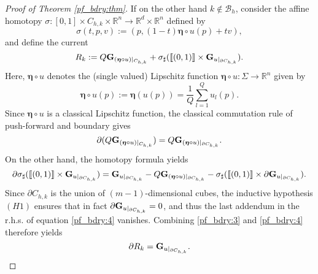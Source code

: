 \documentclass[a4paper,11pt,reqno]{amsart}
\theoremstyle{definition}
\numberwithin{equation}{section}
\numberwithin{subsection}{section}
\newcommand{\R}{\mathbb{R}}
\newcommand{\bfeta}{\boldsymbol{\eta}}
\begin{document}
\begin{proof}[Proof of Theorem \ref{pf_bdry:thm}]
If on the other hand $k \notin \mathscr{B}_{h}$, consider the affine homotopy $\sigma \colon \left[ 0,1 \right] \times C_{h,k} \times \R^{n} \to \R^{d} \times \R^{n}$ defined by
\begin{equation}
\sigma(t,p,v) := \left( p, (1-t)\bfeta \circ u(p) + t v \right), 
\end{equation}
and define the current
\begin{equation}
R_{k} := Q {\bf G}_{(\bfeta \circ u)|_{C_{h,k}}} + \sigma_{\sharp}(\llbracket (0,1) \rrbracket \times {\bf G}_{u|_{\partial C_{h,k}}}).
\end{equation}
Here, $\bfeta \circ u$ denotes the (single valued) Lipschitz function $\bfeta \circ u \colon \Sigma \to \R^{n}$ given by
\[
\bfeta \circ u(p) := \bfeta(u(p)) = \frac{1}{Q} \sum_{l=1}^{Q} u_{l}(p).
\]
Since $\bfeta \circ u$ is a classical Lipschitz function, the classical commutation rule of push-forward and boundary gives 
\begin{equation} \label{pf_bdry:3}
\partial (Q {\bf G}_{(\bfeta \circ u)|_{C_{h,k}}}) = Q {\bf G}_{(\bfeta \circ u)|_{\partial C_{h,k}}}.
\end{equation}
On the other hand, the homotopy formula \cite[(26.22)]{Sim83} yields
\begin{equation} \label{pf_bdry:4}
\partial \sigma_{\sharp}(\llbracket (0,1) \rrbracket \times {\bf G}_{u|_{\partial C_{h,k}}}) = {\bf G}_{u|_{\partial C_{h,k}}} - Q {\bf G}_{(\bfeta \circ u)|_{\partial C_{h,k}}} - \sigma_{\sharp}(\llbracket (0,1) \rrbracket \times \partial {\bf G}_{u|_{\partial C_{h,k}}}).
\end{equation}
Since $\partial C_{h,k}$ is the union of $(m-1)$-dimensional cubes, the inductive hypothesis $(H1)$ ensures that in fact $\partial {\bf G}_{u|_{\partial C_{h,k}}} = 0$, and thus the last addendum in the r.h.s. of equation \eqref{pf_bdry:4} vanishes. Combining \eqref{pf_bdry:3} and \eqref{pf_bdry:4} therefore yields
\begin{equation} \label{pf_bdry:5}
\partial R_{k} = {\bf G}_{u|_{\partial C_{h,k}}}. 
\end{equation}


\end{proof}
\end{document}
